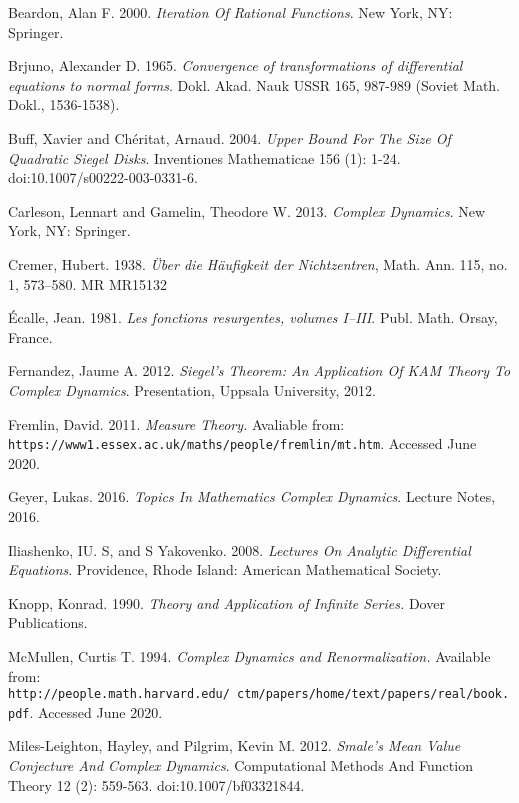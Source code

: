 \documentclass[../main.tex]{subfiles}
\begin{document}

\begin{thebibliography}{9}
Beardon, Alan F. 2000. \textit{Iteration Of Rational Functions}. New York, NY: Springer.

Brjuno, Alexander D. 1965. \textit{Convergence of transformations of differential equations to normal forms}. Dokl. Akad. Nauk USSR 165, 987-989
(Soviet Math. Dokl., 1536-1538).

Buff, Xavier and Ch\'eritat, Arnaud. 2004. \textit{Upper Bound For The Size Of Quadratic Siegel Disks}. Inventiones Mathematicae 156 (1): 1-24. doi:10.1007/s00222-003-0331-6.

Carleson, Lennart and Gamelin, Theodore W. 2013. \textit{Complex Dynamics}. New York, NY: Springer.

Cremer, Hubert. 1938. \textit{Über die Häufigkeit der Nichtzentren}, Math. Ann. 115, no. 1, 573--580. MR MR15132

Écalle, Jean. 1981. \textit{Les fonctions resurgentes, volumes I–III}. Publ. Math. Orsay, France.

Fernandez, Jaume A. 2012. \textit{Siegel’s Theorem: An Application Of KAM Theory To Complex Dynamics}. Presentation, Uppsala University, 2012.

Fremlin, David. 2011. \textit{Measure Theory.} Avaliable from: \texttt{https://www1.essex.ac.uk/maths/people/fremlin/mt.htm}. Accessed June 2020.

Geyer, Lukas. 2016. \textit{Topics In Mathematics Complex Dynamics}. Lecture Notes, 2016.

Iliashenko, IU. S, and S Yakovenko. 2008. \textit{Lectures On Analytic Differential Equations}. Providence, Rhode Island: American Mathematical Society.

Knopp, Konrad. 1990. \textit{Theory and Application of Infinite Series.} Dover Publications.

McMullen, Curtis T. 1994. \textit{Complex Dynamics and Renormalization.} Available from: \texttt{http://people.math.harvard.edu/~ctm/papers/home/text/papers/real/book.pdf}. Accessed June 2020.

Miles-Leighton, Hayley, and Pilgrim, Kevin M. 2012. \textit{Smale’s Mean Value Conjecture And Complex Dynamics}. Computational Methods And Function Theory 12 (2): 559-563. doi:10.1007/bf03321844.


\end{thebibliography}
\end{document}
